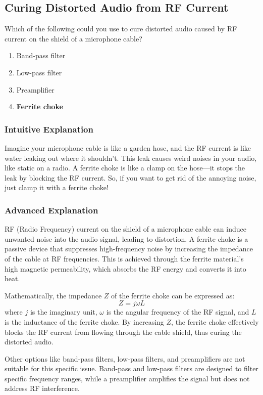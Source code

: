 \subsection{Curing Distorted Audio from RF Current}
\label{T7B04}

\begin{tcolorbox}[colback=gray!10!white,colframe=black!75!black,title=T7B04]
Which of the following could you use to cure distorted audio caused by RF current on the shield of a microphone cable?
\begin{enumerate}[label=\Alph*)]
    \item Band-pass filter
    \item Low-pass filter
    \item Preamplifier
    \item \textbf{Ferrite choke}
\end{enumerate}
\end{tcolorbox}

\subsubsection{Intuitive Explanation}
Imagine your microphone cable is like a garden hose, and the RF current is like water leaking out where it shouldn't. This leak causes weird noises in your audio, like static on a radio. A ferrite choke is like a clamp on the hose—it stops the leak by blocking the RF current. So, if you want to get rid of the annoying noise, just clamp it with a ferrite choke!

\subsubsection{Advanced Explanation}
RF (Radio Frequency) current on the shield of a microphone cable can induce unwanted noise into the audio signal, leading to distortion. A ferrite choke is a passive device that suppresses high-frequency noise by increasing the impedance of the cable at RF frequencies. This is achieved through the ferrite material's high magnetic permeability, which absorbs the RF energy and converts it into heat.

Mathematically, the impedance \( Z \) of the ferrite choke can be expressed as:
\[
Z = j\omega L
\]
where \( j \) is the imaginary unit, \( \omega \) is the angular frequency of the RF signal, and \( L \) is the inductance of the ferrite choke. By increasing \( Z \), the ferrite choke effectively blocks the RF current from flowing through the cable shield, thus curing the distorted audio.

Other options like band-pass filters, low-pass filters, and preamplifiers are not suitable for this specific issue. Band-pass and low-pass filters are designed to filter specific frequency ranges, while a preamplifier amplifies the signal but does not address RF interference.

